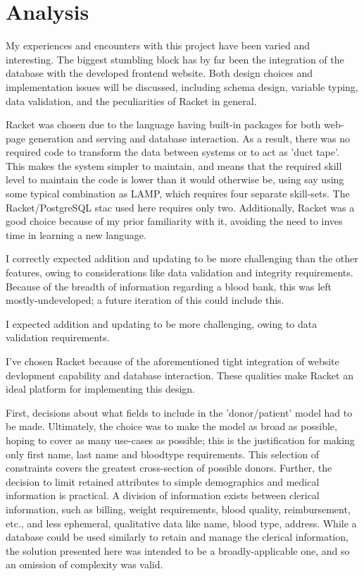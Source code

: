 \documentclass[runningheads,a4paper]{llncs}
\begin{document}
\section{Analysis}\label{sec:analysis}
My experiences and encounters with this project have been varied and
interesting. The biggest stumbling block has by far been the
integration of the database with the developed frontend website. Both
design choices and implementation issues will be discussed, including
schema design, variable typing, data validation, and the peculiarities
of Racket in general.

Racket was chosen due to the language having built-in packages for
both web-page generation and serving and database interaction. As a
result, there was no required code to transform the data between
systems or to act as 'duct tape'. This makes the system simpler to
maintain, and means that the required skill level to maintain the code
is lower than it would otherwise be, using say using some typical
combination as LAMP, which requires four separate skill-sets. The
Racket/PostgreSQL stac used here requires only two. Additionally,
Racket was a good choice because of my prior familiarity with it,
avoiding the need to inves time in learning a new language.

I correctly expected addition and updating to be more challenging than
the other features, owing to considerations like data validation and
integrity requirements. Because of the breadth of information
regarding a blood bank, this was left mostly-undeveloped; a future
iteration of this could include this.

I expected addition and updating to be more
challenging, owing to data validation requirements.

  I've chosen
Racket because of the aforementioned tight integration of website
devlopment capability and database interaction. These qualities make
Racket an ideal platform for implementing this design. 

First, decisions about what fields to include in the 'donor/patient'
model had to be made. Ultimately, the choice was to make the model as
broad as possible, hoping to cover as many use-cases as possible; this
is the justification for making only first name, last name and
bloodtype requirements. This selection of constraints covers the
greatest cross-section of possible donors. Further, the decision to
limit retained attributes to simple demographics and medical
information is practical. A division of information exists between
clerical information, such as billing, weight requirements, blood
quality, reimbursement, etc., and less ephemeral, qualitative data
like name, blood type, address. While a database could be used
similarly to retain and manage the clerical information, the solution
presented here was intended to be a broadly-applicable one, and so an
omission of complexity was valid.
\end{document}

